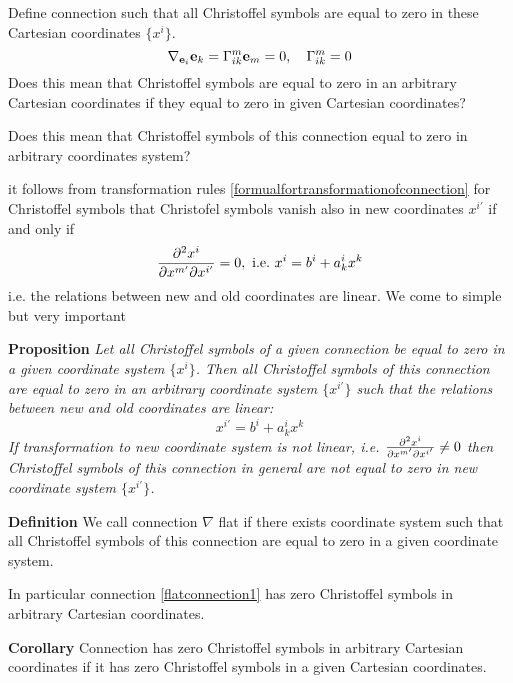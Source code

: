 \documentclass[12pt]{article}
\theoremstyle{theorem}
\numberwithin{equation}{section}
\begin{document}
   Define connection such that all Christoffel symbols
    are equal to zero in these Cartesian coordinates $\{x^i\}$.
\begin{equation}\label{flatconnection1}
  \nabla_{{\bf e}_i}{\bf e}_k=\Gamma_{ik}^m{\bf e}_m=0,\quad   \Gamma_{ik}^m=0
\end{equation}
Does  this mean that Christoffel symbols are equal to zero in
an arbitrary Cartesian coordinates if they equal to zero in given Cartesian coordinates?

 Does this mean that  Christoffel symbols of this connection 
equal to zero in arbitrary coordinates system?


  it follows from transformation rules 
\eqref{formualfortransformationofconnection} for Christoffel symbols
that Christofel symbols vanish also in new coordinates $x^{i'}$
if and only if
                    \begin{equation}\label{additionalterm}
                    {\partial^2 x^{i}\over \partial x^{m'}\partial x^{i'}}=0, \,\,{\rm i.e.}\,\,
                    x^i=b^i+a^i_kx^k
                    \end{equation}
i.e. the relations between new and old coordinates are linear.
We come to simple but very important
\m

 {\bf Proposition} {\it
   Let all Christoffel symbols of a given connection be equal to zero
 in a given coordinate system $\{x^i\}$.
  Then   all Christoffel symbols of this connection are equal to zero in an arbitrary
 coordinate system  $\{x^{i'}\}$ such that the relations between new and old coordinates are linear:
               \begin{equation}\label{additionalterm1}
                   x^{i'}=b^i+a^i_kx^k
                    \end{equation}
 If transformation to new coordinate system is not linear, i.e.  ${\partial^2 x^{i}\over \partial x^{m'}\partial x^{i'}}\not=0$
 then Christoffel symbols of this connection in general are not equal to zero in new
 coordinate system  $\{x^{i'}\}$.}

\m

{\bf Definition} We call connection $\nabla$ flat if there exists coordinate system such that
all Christoffel symbols of this connection are equal to zero in a given coordinate system.

\m

In particular connection \eqref{flatconnection1} has zero Christoffel symbols in arbitrary Cartesian coordinates.



{\bf Corollary} Connection has zero Christoffel symbols in arbitrary Cartesian coordinates
if it has zero Christoffel symbols in a given Cartesian coordinates.
\end{document}
